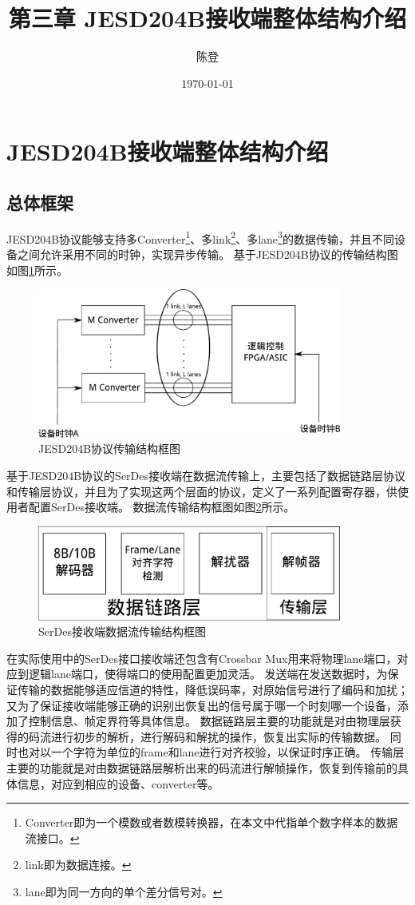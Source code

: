 \documentclass[UTF8]{ctexart}
\title{第三章 JESD204B接收端整体结构介绍}
\author{陈登}
\date{\today}
\begin{document}
\section{JESD204B接收端整体结构介绍}

\subsection{总体框架}

JESD204B协议能够支持多Converter\footnote{Converter即为一个模数或者数模转换器，在本文中代指单个数字样本的数据流接口。}、多link\footnote{link即为数据连接。}、多lane\footnote{lane即为同一方向的单个差分信号对。}的数据传输，并且不同设备之间允许采用不同的时钟，实现异步传输。
基于JESD204B协议的传输结构图如图\ref{fig:jesd204b_stuct}所示。

\begin{figure}[H]
\centering
\includegraphics[width=10cm]{./img/jesd204b_stuct.pdf}
\caption{JESD204B协议传输结构框图}
\label{fig:jesd204b_stuct}
\end{figure}

基于JESD204B协议的SerDes接收端在数据流传输上，主要包括了数据链路层协议和传输层协议，并且为了实现这两个层面的协议，定义了一系列配置寄存器，供使用者配置SerDes接收端。
数据流传输结构框图如图\ref{fig:serdes_sturct_link_transport_layer}所示。

\begin{figure}[H]
\centering
\includegraphics[width=10cm]{./img/serdes_sturct_link_transport_layer.pdf}
\caption{SerDes接收端数据流传输结构框图}
\label{fig:serdes_sturct_link_transport_layer}
\end{figure}

在实际使用中的SerDes接口接收端还包含有Crossbar Mux用来将物理lane端口，对应到逻辑lane端口，使得端口的使用配置更加灵活。
发送端在发送数据时，为保证传输的数据能够适应信道的特性，降低误码率，对原始信号进行了编码和加扰；又为了保证接收端能够正确的识别出恢复出的信号属于哪一个时刻哪一个设备，添加了控制信息、帧定界符等具体信息。
数据链路层主要的功能就是对由物理层获得的码流进行初步的解析，进行解码和解扰的操作，恢复出实际的传输数据。
同时也对以一个字符为单位的frame和lane进行对齐校验，以保证时序正确。
传输层主要的功能就是对由数据链路层解析出来的码流进行解帧操作，恢复到传输前的具体信息，对应到相应的设备、converter等。
\end{document}
